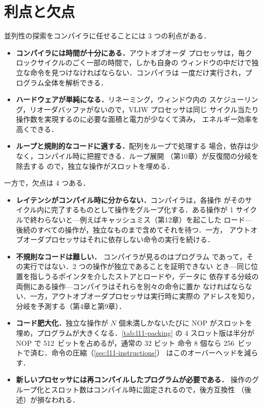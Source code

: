 \documentclass[../main.tex]{subfiles}
\begin{document}
\section{利点と欠点}
\label{sec:l11-good-bad}

並列性の探索をコンパイラに任せることには 3 つの利点がある．
\begin{itemize}
  \item \textbf{コンパイラには時間が十分にある．}アウトオブオーダ
    プロセッサは，毎クロックサイクルのごく一部の時間で，しかも自身の
    ウィンドウの中だけで独立な命令を見つけなければならない．コンパイラは
    一度だけ実行され，プログラム全体を解析できる．
  \item \textbf{ハードウェアが単純になる．}リネーミング，ウィンドウ内の
    スケジューリング，リオーダバッファがないので，VLIW プロセッサは同じ
    サイクル当たり操作数を実現するのに必要な面積と電力が少なくて済み，
    エネルギー効率を高くできる．
  \item \textbf{ループと規則的なコードに適する．}配列をループで処理する
    場合，依存は少なく，コンパイル時に把握できる．ループ展開
    （第10章）が反復間の分岐を除去する
    ので，独立な操作がスロットを埋める．
\end{itemize}
一方で，欠点は 4 つある．
\begin{itemize}
  \item \textbf{レイテンシがコンパイル時に分からない．}コンパイラは，各操作
    がそのサイクル内に完了するものとして操作をグループ化する．ある操作が
    1 サイクルで終わらないと---例えばキャッシュミス（第12章）を起こした
    ロード---後続のすべての操作が，独立なものまで含めてそれを待つ．一方，
    アウトオブオーダプロセッサはそれに依存しない命令の実行を続ける．%
  \item \textbf{不規則なコードは難しい．}%
    コンパイラが見るのはプログラム
    であって，その実行ではない．2 つの操作が独立であることを証明できない
    とき---同じ位置を指しうるポインタを介したストアとロードや，データに
    依存する分岐の両側にある操作---コンパイラはそれらを別々の命令に置か
    なければならない．一方，アウトオブオーダプロセッサは実行時に実際の
    アドレスを知り，分岐を予測する（第4章と第9章）．
  \item \textbf{コード肥大化．}独立な操作が $N$ 個未満しかないたびに
    NOP がスロットを埋め，プログラムが大きくなる．\cref{tab:l11-packing}
    の 4 スロット版は半分が NOP で 512~ビットを占めるが，通常の 32 ビット
    命令 8 個なら 256~ビットで済む．命令の圧縮（\cref{sec:l11-instructions}）
    はこのオーバーヘッドを減らす．
  \item \textbf{新しいプロセッサには再コンパイルしたプログラムが必要である．}%
    操作のグループ化とスロット数はコンパイル時に固定されるので，後方互換性
    （後述）が損なわれる．
\end{itemize}
\end{document}
